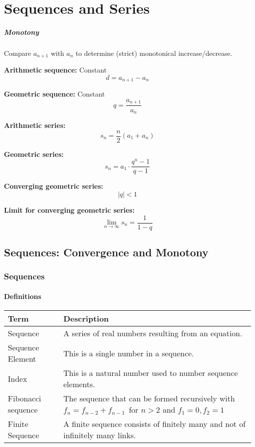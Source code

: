 \documentclass{book}
\begin{document}

\chapter{Sequences and Series}

\paragraph{Monotony} Compare $a_{n+1}$ with $a_{n}$ to determine (strict) monotonical increase/decrease.

\textbf{Arithmetic sequence:} Constant
\[
  d = a_{n+1} - a_{n}
\]

\textbf{Geometric sequence:} Constant
\[
  q = \frac{a_{n+1}}{a_{n}}
\]

\textbf{Arithmetic series:}
\[
  s_{n} = \frac{n}{2}\left(a_{1}+a_{n}\right)
\]

\textbf{Geometric series:}
\[
  s_{n} = a_{1}\cdot\frac{q^{n}-1}{q-1}
\]

\textbf{Converging geometric series:}
\[
  |q| < 1
\]

\textbf{Limit for converging geometric series:}
\[
  \lim\limits_{n\to\infty}s_{n} = \frac{1}{1-q}
\]

\section{Sequences: Convergence and Monotony}
\subsection{Sequences}
\subsubsection{Definitions}
\begin{tabular}{p{3cm}p{10.5cm}}
  \toprule
  \textbf{Term} & \textbf{Description} \\
  \midrule
  Sequence    & A series of real numbers resulting from an equation.\\
  \midrule
  Sequence Element    & This is a single number in a sequence.\\
  \midrule
  Index       & This is a natural number used to number sequence elements.\\
  \midrule
  Fibonacci sequence & The sequence that can be formed recursively with $f_{n} = f_{n-2} + f_{n-1} \,$ for $n>2$ and $f_{1} = 0, f_{2} = 1$\\
  \midrule
  Finite Sequence & A finite sequence consists of finitely many and not of infinitely many links.\\
  \bottomrule
\end{tabular}
\end{document}

